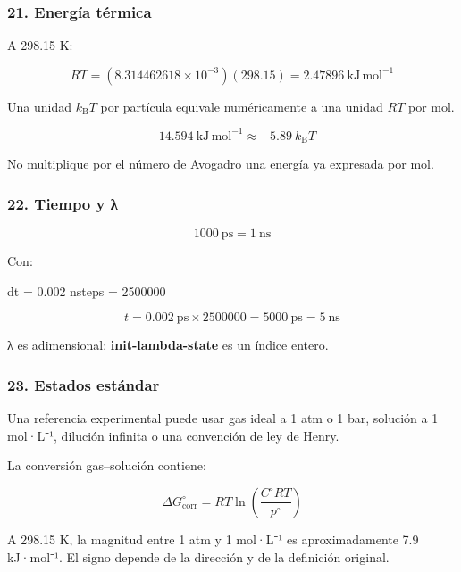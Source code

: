 \documentclass[
  spanish,
  11pt,
  a4paper]{article}
\newenvironment{Shaded}{\begin{snugshade}}{\end{snugshade}}
\newcommand{\DataTypeTok}[1]{\textcolor[rgb]{0.13,0.29,0.53}{#1}}
\newcommand{\DecValTok}[1]{\textcolor[rgb]{0.00,0.00,0.81}{#1}}
\newcommand{\FloatTok}[1]{\textcolor[rgb]{0.00,0.00,0.81}{#1}}
\newcommand{\OtherTok}[1]{\textcolor[rgb]{0.56,0.35,0.01}{#1}}
\newcommand{\StringTok}[1]{\textcolor[rgb]{0.31,0.60,0.02}{#1}}
\begin{document}
\subsubsection{21. Energía térmica}\label{energuxeda-tuxe9rmica}

A 298.15 K:

\[
RT=
(8.314462618\times10^{-3})
(298.15)
=
2.47896\ \mathrm{kJ\,mol^{-1}}
\]

Una unidad \(k_\mathrm{B}T\) por partícula equivale numéricamente a una
unidad \(RT\) por mol.

\[
-14.594\ \mathrm{kJ\,mol^{-1}}
\approx
-5.89\ k_\mathrm{B}T
\]

No multiplique por el número de Avogadro una energía ya expresada por
mol.

\subsubsection{22. Tiempo y λ}\label{tiempo-y-ux3bb}

\[
1000\ \mathrm{ps}=1\ \mathrm{ns}
\]

Con:

\begin{Shaded}
\begin{Highlighting}[]
\DataTypeTok{dt     }\OtherTok{=}\StringTok{ }\FloatTok{0.002}
\DataTypeTok{nsteps }\OtherTok{=}\StringTok{ }\DecValTok{2500000}
\end{Highlighting}
\end{Shaded}

\[
t=0.002\ \mathrm{ps}\times2500000
=5000\ \mathrm{ps}
=5\ \mathrm{ns}
\]

λ es adimensional; \textbf{init-lambda-state} es un índice entero.

\subsubsection{23. Estados estándar}\label{estados-estuxe1ndar}

Una referencia experimental puede usar gas ideal a 1 atm o 1 bar,
solución a 1 mol·L⁻¹, dilución infinita o una convención de ley de
Henry.

La conversión gas--solución contiene:

\[
\Delta G^\circ_{\mathrm{corr}}
=
RT\ln
\left(
\frac{C^\circ RT}{p^\circ}
\right)
\]

A 298.15 K, la magnitud entre 1 atm y 1 mol·L⁻¹ es aproximadamente 7.9
kJ·mol⁻¹. El signo depende de la dirección y de la definición original.
\end{document}
